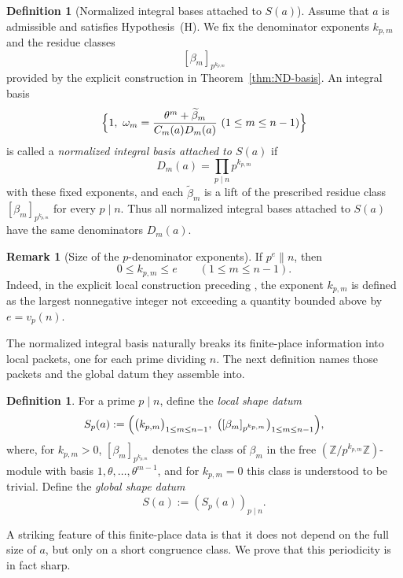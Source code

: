 \documentclass[11pt,letterpaper]{amsart}
\newcommand{\Z}{\mathbb{Z}}
\theoremstyle{plain}
\theoremstyle{definition}
\newtheorem{definition}[theorem]{Definition}
\newtheorem{remark}[theorem]{Remark}
\begin{document}
\begin{definition}[Normalized integral bases attached to \(S(a)\)]
\label{def:normalized-integral-basis}
Assume that \(a\) is admissible and satisfies Hypothesis~\textup{(H)}.  We fix
the denominator exponents \(k_{p,m}\) and the residue classes
\[
[\beta_m]_{p^{k_{p,m}}}
\]
provided by the explicit construction in Theorem~\ref{thm:ND-basis}.  An
integral basis
\[
\Bigl\{
1,\ 
\omega_m=\frac{\theta^m+\widetilde\beta_m}{C_m(a)D_m(a)}
\ (1\le m\le n-1)
\Bigr\}
\]
is called a \emph{normalized integral basis attached to \(S(a)\)} if
\[
D_m(a)=\prod_{p\mid n}p^{k_{p,m}}
\]
with these fixed exponents, and each \(\widetilde\beta_m\) is a lift of the
prescribed residue class \([\beta_m]_{p^{k_{p,m}}}\) for every \(p\mid n\).
Thus all normalized integral bases attached to \(S(a)\) have the same
denominators \(D_m(a)\).
\end{definition}

\begin{remark}[Size of the \(p\)-denominator exponents]
\label{rem:kpm-bound}
If \(p^e\parallel n\), then
\[
0\le k_{p,m}\le e\qquad(1\le m\le n-1).
\]
Indeed, in the explicit local construction preceding
\cite[Theorem~1.6]{JakharKhandujaSangwan2021},
the exponent \(k_{p,m}\) is defined as the largest nonnegative integer
not exceeding a quantity bounded above by \(e=v_p(n)\).
\end{remark}

The normalized integral basis naturally breaks its finite-place information into local packets, one for each prime dividing \(n\). The next definition names those packets and the global datum they assemble into.

\begin{definition}
\label{def:ND-shape}
For a prime \(p\mid n\), define the \emph{local shape datum}
\[
S_p(a):=\Bigl(\bigl(k_{p,m}\bigr)_{1\le m\le n-1},\
\bigl([\beta_m]_{p^{k_{p,m}}}\bigr)_{1\le m\le n-1}\Bigr),
\]
where, for \(k_{p,m}>0\), \([\beta_m]_{p^{k_{p,m}}}\) denotes the class of \(\beta_m\) in the
free \((\Z/p^{k_{p,m}}\Z)\)-module with basis \(1,\theta,\dots,\theta^{m-1}\), and for
\(k_{p,m}=0\) this class is understood to be trivial.
Define the \emph{global shape datum}
\[
S(a):=(S_p(a))_{p\mid n}.
\]
\end{definition}

A striking feature of this finite-place data is that it does not depend on the full size of \(a\), but only on a short congruence class. We prove that this periodicity is in fact sharp.
\end{document}

